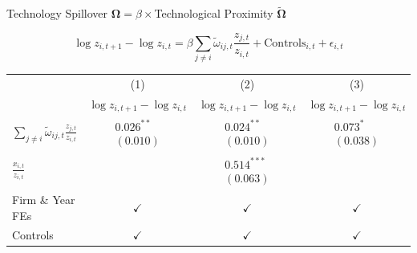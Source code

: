 \documentclass[
  10pt,
  aspectratio=169,   %
]{beamer}
\theoremstyle{plain}
\begin{document}
\begin{frame}{Technology Spillover $\bm{\Omega}=\beta\times$Technological Proximity $\bm{\widetilde{\Omega}}$ \hyperlink{first_stage}{}}
  \label{regression}
  {\footnotesize
    \[
      \log z_{i,t+1}-\log z_{i,t}
      =\beta\sum_{j\neq i}\tilde{\omega}_{ij,t} \frac{z_{j,t}}{z_{i,t}}
      +\text{Controls}_{i,t}
      +\epsilon_{i,t}
    \]
    \begin{center}
      \setlength{\tabcolsep}{6pt} %
      \begin{tabular}{lccc}
        \hline\hline
                         & (1)                                                                   & (2)          & (3)          \\
                         & $\log z_{i,t+1}-\log z_{i,t}$
                         & $\log z_{i,t+1}-\log z_{i,t}$
                         & $\log z_{i,t+1}-\log z_{i,t}$                                                                       \\
        \hline
        $\sum_{j\neq i}\tilde{\omega}_{ij,t} \frac{z_{j,t}}{z_{i,t}}$
                         & $\begin{array}{c}\text{0.026}^{**}\\(\text{0.010})\end{array}$
                         & $\begin{array}{c}\text{0.024}^{**}\\(\text{0.010})\end{array}$
                         & $\begin{array}{c}\text{0.073}^{*}\\(\text{0.038})\end{array}$                                 \\
        $\frac{x_{i,t}}{z_{i,t}}$
                         &
                         & $\begin{array}{c}\text{0.514}^{***}\\(\text{0.063})\end{array}$
                         &                                                                                                     \\
        \hline
        Firm \& Year FEs & $\checkmark$                                                          & $\checkmark$ & $\checkmark$ \\
        Controls         & $\checkmark$                                                          & $\checkmark$ & $\checkmark$ \\

\end{tabular}
\end{center}}
\end{frame}
\end{document}
